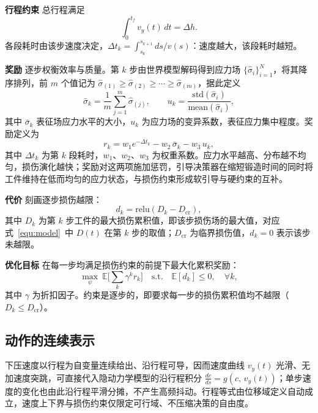 \textbf{行程约束} 总行程满足
\begin{equation}
\int_{0}^{t_f}v_y(t)\,dt=\Delta h .
\end{equation}
各段耗时由该步速度决定，$\Delta t_k=\int_{s_k}^{s_{k+1}}ds/v(s)$：速度越大，该段耗时越短。

\textbf{奖励} 逐步权衡效率与质量。第 $k$ 步由世界模型解码得到应力场 $\{\hat{\sigma}_i\}_{i=1}^{N}$，将其降序排列，前 $m$ 个值记为 $\hat{\sigma}_{(1)}\ge\hat{\sigma}_{(2)}\ge\cdots\ge\hat{\sigma}_{(m)}$，据此定义
\begin{equation}
\bar{\sigma}_k=\frac{1}{m}\sum_{j=1}^{m}\hat{\sigma}_{(j)},\qquad
u_k=\frac{\mathrm{std}(\hat{\sigma}_i)}{\mathrm{mean}(\hat{\sigma}_i)},
\end{equation}
其中 $\bar{\sigma}_k$ 表征场应力水平的大小，$u_k$ 为应力场的变异系数，表征应力集中程度。奖励定义为
\begin{equation}
r_k=w_1 e^{-\Delta t_k}-w_2\,\bar{\sigma}_k-w_3\,u_k,
\end{equation}
其中 $\Delta t_k$ 为第 $k$ 段耗时，$w_1$、$w_2$、$w_3$ 为权重系数。应力水平越高、分布越不均匀，损伤演化越快；奖励对这两项施加惩罚，引导决策器在缩短锻造时间的同时将工件维持在低而均匀的应力状态，与损伤约束形成软引导与硬约束的互补。

\textbf{代价} 刻画逐步损伤越限：
\begin{equation}
d_k=\mathrm{relu}(D_k-D_{\text{cr}}),
\end{equation}
其中 $D_k$ 为第 $k$ 步工件的最大损伤累积值，即该步损伤场的最大值，对应式~\ref{equ:model}~中 $D(t)$ 在第 $k$ 步的取值；$D_{\text{cr}}$ 为临界损伤值，$d_k=0$ 表示该步未越限。

\textbf{优化目标} 在每一步均满足损伤约束的前提下最大化累积奖励：
\begin{equation}
\max_{\psi}\ \mathbb{E}\Big[\sum_{k}\gamma^{k} r_k\Big]\quad \text{s.t.}\quad \mathbb{E}[d_k]\le 0,\quad \forall k,
\end{equation}
其中 $\gamma$ 为折扣因子。约束是逐步的，即要求每一步的损伤累积值均不越限（$D_k\le D_{\text{cr}}$）。

\subsection{动作的连续表示}
下压速度以行程为自变量连续给出、沿行程可导，因而速度曲线 $v_y(t)$ 光滑、无加速度突跳，可直接代入隐动力学模型的沿行程积分 $\frac{dc}{ds}=g(c,\,v_y(t))$；单步速度的变化也由此沿行程平滑分摊，不产生高频抖动。行程等式由位移域定义自动成立，速度上下界与损伤约束仅限定可行域、不压缩决策的自由度。

